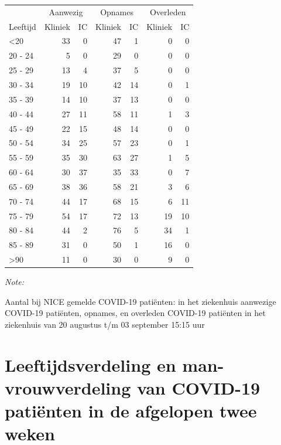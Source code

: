 \documentclass[
  english,
  man,floatsintext]{apa6}
\begin{document}
\begin{table}
\centering\begingroup\fontsize{10}{12}\selectfont

\begin{threeparttable}
\begin{tabular}{lrrrrrr}
\toprule
\multicolumn{1}{c}{ } & \multicolumn{2}{c}{Aanwezig} & \multicolumn{2}{c}{Opnames} & \multicolumn{2}{c}{Overleden} \\
\cmidrule(l{3pt}r{3pt}){2-3} \cmidrule(l{3pt}r{3pt}){4-5} \cmidrule(l{3pt}r{3pt}){6-7}
Leeftijd & Kliniek & IC & Kliniek & IC & Kliniek & IC\\
\midrule
<20 & 33 & 0 & 47 & 1 & 0 & 0\\
20 - 24 & 5 & 0 & 29 & 0 & 0 & 0\\
25 - 29 & 13 & 4 & 37 & 5 & 0 & 0\\
30 - 34 & 19 & 10 & 42 & 14 & 0 & 1\\
35 - 39 & 14 & 10 & 37 & 13 & 0 & 0\\
40 - 44 & 27 & 11 & 58 & 11 & 1 & 3\\
45 - 49 & 22 & 15 & 48 & 14 & 0 & 0\\
50 - 54 & 34 & 25 & 57 & 23 & 0 & 1\\
55 - 59 & 35 & 30 & 63 & 27 & 1 & 5\\
60 - 64 & 30 & 37 & 35 & 33 & 0 & 7\\
65 - 69 & 38 & 36 & 58 & 21 & 3 & 6\\
70 - 74 & 44 & 17 & 68 & 15 & 6 & 11\\
75 - 79 & 54 & 17 & 72 & 13 & 19 & 10\\
80 - 84 & 44 & 2 & 76 & 5 & 34 & 1\\
85 - 89 & 31 & 0 & 50 & 1 & 16 & 0\\
>90 & 11 & 0 & 30 & 0 & 9 & 0\\
\bottomrule
\end{tabular}
\begin{tablenotes}
\item \textit{Note: } 
\item Aantal bij NICE gemelde COVID-19 patiënten: in het ziekenhuis aanwezige COVID-19 patiënten, opnames, en overleden COVID-19 patiënten in het ziekenhuis van 20 augustus t/m 03 september 15:15 uur
\end{tablenotes}
\end{threeparttable}
\endgroup{}
\end{table}

\newpage

\hypertarget{leeftijdsverdeling-en-man-vrouwverdeling-van-covid-19-patiuxebnten-in-de-afgelopen-twee-weken}{%
\section{Leeftijdsverdeling en man-vrouwverdeling van COVID-19 patiënten in de afgelopen twee weken}\label{leeftijdsverdeling-en-man-vrouwverdeling-van-covid-19-patiuxebnten-in-de-afgelopen-twee-weken}}
\end{document}
